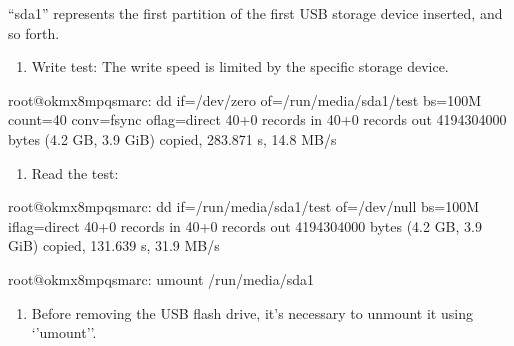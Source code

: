 \documentclass[letterpaper,10pt,openany,english]{sphinxmanual}
\begin{document}
\sphinxAtStartPar
“sda1” represents the first partition of the first USB storage device inserted, and so forth.
\begin{enumerate}
%
\setcounter{enumi}{2}
\item {} 
\sphinxAtStartPar
Write test: The write speed is limited by the specific storage device.

\end{enumerate}

\begin{sphinxVerbatim}[commandchars=\\\{\}]
root@ok\PYGZhy{}mx8mpq\PYGZhy{}smarc:\PYGZti{}\PYGZsh{} dd if=/dev/zero of=/run/media/sda1/test bs=100M count=40 \PYGZbs{}
conv=fsync oflag=direct
40+0 records in
40+0 records out
4194304000 bytes (4.2 GB, 3.9 GiB) copied, 283.871 s, 14.8 MB/s
\end{sphinxVerbatim}
\begin{enumerate}
%
\setcounter{enumi}{3}
\item {} 
\sphinxAtStartPar
Read the test:

\end{enumerate}

\sphinxAtStartPar
{}

\begin{sphinxVerbatim}[commandchars=\\\{\}]
root@ok\PYGZhy{}mx8mpq\PYGZhy{}smarc:\PYGZti{}\PYGZsh{} dd if=/run/media/sda1/test of=/dev/null bs=100M iflag=direct
40+0 records in
40+0 records out
4194304000 bytes (4.2 GB, 3.9 GiB) copied, 131.639 s, 31.9 MB/s
\end{sphinxVerbatim}

\begin{sphinxVerbatim}[commandchars=\\\{\}]
root@ok\PYGZhy{}mx8mpq\PYGZhy{}smarc:\PYGZti{}\PYGZsh{} umount /run/media/sda1
\end{sphinxVerbatim}
\begin{enumerate}
%
\setcounter{enumi}{4}
\item {} 
\sphinxAtStartPar
Before removing the USB flash drive, it’s necessary to unmount it using ‘’umount’’.

\end{enumerate}
\end{document}
